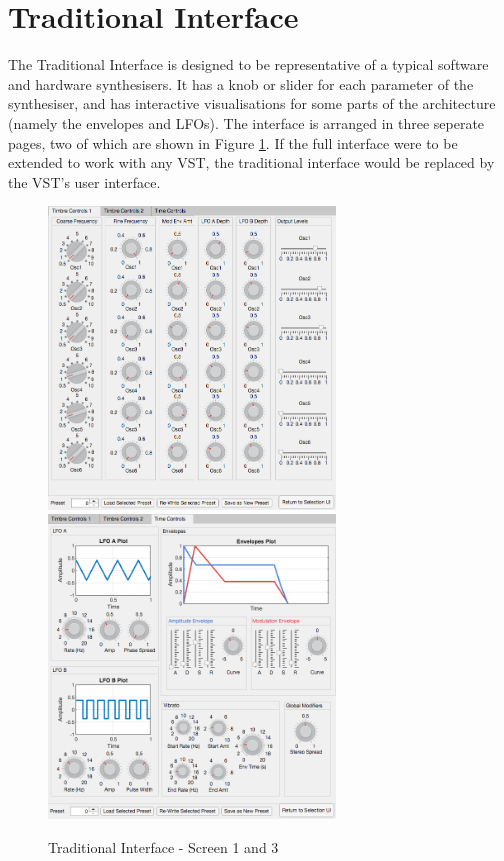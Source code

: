 \documentclass[11pt, oneside]{report}   	%
\begin{document}
\section{Traditional Interface}
The Traditional Interface is designed to be representative of a typical software and hardware synthesisers. It has a knob or slider for each parameter of the synthesiser, and has interactive visualisations for some parts of the architecture (namely the envelopes and LFOs). The interface is arranged in three seperate pages, two of which are shown in Figure \ref{fig:TraditionalInterface}. 
If the full interface were to be extended to work with any VST, the traditional interface would be replaced by the VST's user interface. 
\begin{figure}[h] 
	\centering
	\hspace*{-0.2cm}
\includegraphics[width = 3in]{TraditionalUI1.png}
\hspace*{0.2cm}
	\includegraphics[width = 3in]{TraditionalUI3.png}
	\caption{Traditional Interface - Screen 1 and 3}
	\label{fig:TraditionalInterface}
\end{figure}
\end{document}
